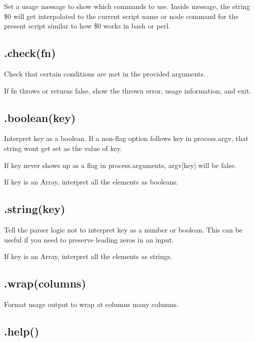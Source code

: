 Set a usage message to show which commands to use. Inside {\ttfamily message}, the string {\ttfamily \$0} will get interpolated to the current script name or node command for the present script similar to how {\ttfamily \$0} works in bash or perl.

\subsection*{.check(fn) }

Check that certain conditions are met in the provided arguments.

If {\ttfamily fn} throws or returns {\ttfamily false}, show the thrown error, usage information, and exit.

\subsection*{.boolean(key) }

Interpret {\ttfamily key} as a boolean. If a non-\/flag option follows {\ttfamily key} in {\ttfamily process.\+argv}, that string won\textquotesingle{}t get set as the value of {\ttfamily key}.

If {\ttfamily key} never shows up as a flag in {\ttfamily process.\+arguments}, {\ttfamily argv\mbox{[}key\mbox{]}} will be {\ttfamily false}.

If {\ttfamily key} is an Array, interpret all the elements as booleans.

\subsection*{.string(key) }

Tell the parser logic not to interpret {\ttfamily key} as a number or boolean. This can be useful if you need to preserve leading zeros in an input.

If {\ttfamily key} is an Array, interpret all the elements as strings.

\subsection*{.wrap(columns) }

Format usage output to wrap at {\ttfamily columns} many columns.

\subsection*{.help() }

